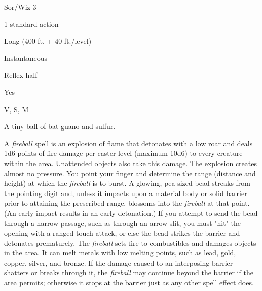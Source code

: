 
\begin{description*}
\item[Level:] Sor/Wiz 3
\item[Casting Time:] 1 standard action
\item[Range:] Long (400 ft. + 40 ft./level)
\item[Duration:] Instantaneous
\item[Saving Throw:] Reflex half
\item[Spell Resistance:] Yes
\item[Components:] V, S, M
\item[Arcane Material Component:] A tiny ball of bat guano and sulfur.
\end{description*}

A \textit{fireball} spell is an explosion of flame that detonates with a low roar
and deals 1d6 points of fire damage per caster level (maximum 10d6) to every creature
within the area. Unattended objects also take this damage. The explosion creates
almost no pressure.
You point your finger and determine the range (distance and height) at which the
\textit{fireball} is to burst. A glowing, pea-sized bead streaks from the pointing
digit and, unless it impacts upon a material body or solid barrier prior to attaining
the prescribed range, blossoms into the \textit{fireball} at that point. (An early
impact results in an early detonation.) If you attempt to send the bead through
a narrow passage, such as through an arrow slit, you must "hit" the opening with
a ranged touch attack, or else the bead strikes the barrier and detonates prematurely.
The \textit{fireball} sets fire to combustibles and damages objects in the area.
It can melt metals with low melting points, such as lead, gold, copper, silver,
and bronze. If the damage caused to an interposing barrier shatters or breaks through
it, the \textit{fireball} may continue beyond the barrier if the area permits;
otherwise it stops at the barrier just as any other spell effect does.